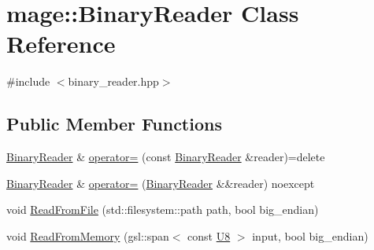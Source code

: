 \hypertarget{classmage_1_1_binary_reader}{}\section{mage\+:\+:Binary\+Reader Class Reference}
\label{classmage_1_1_binary_reader}


{\ttfamily \#include $<$binary\+\_\+reader.\+hpp$>$}

\subsection*{Public Member Functions}
\begin{DoxyCompactItemize}
\item 
\mbox{\hyperlink{classmage_1_1_binary_reader}{Binary\+Reader}} \& \mbox{\hyperlink{classmage_1_1_binary_reader_a0408bb456983b4a03ae42ab69c6f4bc3}{operator=}} (const \mbox{\hyperlink{classmage_1_1_binary_reader}{Binary\+Reader}} \&reader)=delete
\item 
\mbox{\hyperlink{classmage_1_1_binary_reader}{Binary\+Reader}} \& \mbox{\hyperlink{classmage_1_1_binary_reader_a280998bb89dacdcb88ec87c49ce90a02}{operator=}} (\mbox{\hyperlink{classmage_1_1_binary_reader}{Binary\+Reader}} \&\&reader) noexcept
\item 
void \mbox{\hyperlink{classmage_1_1_binary_reader_a38daa2eb250146c537bbc65044a5738f}{Read\+From\+File}} (std\+::filesystem\+::path path, bool big\+\_\+endian)
\item 
void \mbox{\hyperlink{classmage_1_1_binary_reader_a093d95a36bdc45f5d51f48f1ee09bb1f}{Read\+From\+Memory}} (gsl\+::span$<$ const \mbox{\hyperlink{namespacemage_a30677c03d683c4c35630c25f6ff3fb7f}{U8}} $>$ input, bool big\+\_\+endian)
\end{DoxyCompactItemize}
